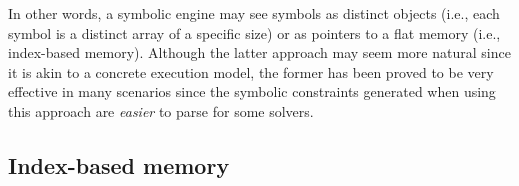 
\iffalse
  \item {\em Subroutines and recursion}: how does the symbolic engine handle subroutines and recursive calls?
In order to support subroutines, the execution state is typically provided with an execution stack. Consider the following recursive example:
    \begin{lstlisting}[basicstyle=\ttfamily\small]
    1.  int fac(int n) {
    2.    if (n <= 1) return 1;
    3.    return n*fac(n - 1);
    3.  }
    \end{lstlisting}
Note that each distinct value of {\tt n} leads to a distinct control flow path. Since {\tt n} can assume up to  $2^{31} - 1$ positive values, a symbolic engine would create as many execution states to cover all the possible paths.
 \vspace{1mm}
 \fi

\vspace{2em}In other words, a symbolic engine may see symbols as distinct objects (i.e., each symbol is a distinct array of a specific size) or as pointers to a flat memory (i.e., index-based memory). Although the latter approach may seem more natural since it is akin to a concrete execution model, the former has been proved to be very effective in many scenarios since the symbolic constraints generated when using this approach are {\em easier} to parse for some solvers.

\subsection{Index-based memory}

